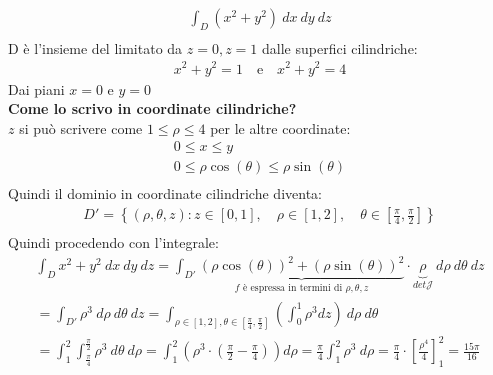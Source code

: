 \documentclass[a4paper, oneside]{article}
\begin{document}
\begin{example}
  \begin{gather*}
    \int_D (x^2+y^2) \ dx \ dy \ dz \\
  \end{gather*}
  D è l'insieme del limitato da $z=0, z=1$ dalle superfici cilindriche:
  \begin{gather*}
    x^2+y^2 = 1 \quad \text{e} \quad x^2+y^2 = 4
  \end{gather*}
  Dai piani $x=0$ e $y=0$\\
  \textbf{Come lo scrivo in coordinate cilindriche?}\\
  $z$ si può scrivere come $1 \leq \rho \leq 4$ per le altre coordinate:
  \begin{gather*}
    0 \leq  x \leq y\\
    0 \leq \rho\cos(\theta) \leq \rho\sin(\theta) \\
  \end{gather*}
  Quindi il dominio in coordinate cilindriche diventa:
  \begin{gather*}
    D' = \left\{ (\rho, \theta ,z) : z \in[0,1] , \quad \rho \in [1,2] , \quad \theta \in \left[\frac{\pi}{4}, \frac{\pi}{2}\right] \right\} \\
  \end{gather*}
  Quindi procedendo con l'integrale:
  \begin{gather*}
    \int_D x^2+y^2 \ dx \ dy \ dz = \int_{D'} \underbrace{(\rho\cos(\theta))^2 + (\rho\sin(\theta))^2}_{f \text{ è espressa in termini di } \rho , \theta , z} \cdot \underbrace{\rho}_{det \mathcal{J}} \ d\rho \ d\theta \ dz \\
    = \int_{D'} \rho^3 \ d\rho \ d\theta \ dz = \int_{\rho \in[1,2] , \theta \in [\frac{\pi}{4}, \frac{\pi}{2}]} \left(\int_0^1 \rho^3 dz\right)  \ d\rho \ d\theta \\
    = \int_1^2 \int_{\frac{\pi}{4}}^{\frac{\pi}{2}} \rho^3 \ d\theta \ d\rho = \int_1^2 \left( \rho^3 \cdot \left( \frac{\pi}{2} - \frac{\pi}{4} \right) \right) d\rho = \frac{\pi}{4} \int_1^2 \rho^3 \ d\rho = \frac{\pi}{4} \cdot \left[ \frac{\rho^4}{4} \right]_1^2 = \frac{15\pi}{16} \\
  \end{gather*}
\end{example}
\end{document}
